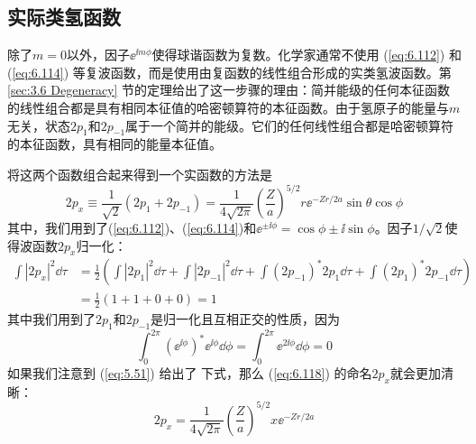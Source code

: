 \subsection*{实际类氢函数}

    除了$m=0$以外，因子$\ee ^{\ii m\phi}$使得球谐函数为复数。化学家通常不使用 (\ref{eq:6.112}) 和 (\ref{eq:6.114}) 等复波函数，而是使用由复函数的线性组合形成的实类氢波函数。第 \ref{sec:3.6 Degeneracy} 节的定理给出了这一步骤的理由：简并能级的任何本征函数的线性组合都是具有相同本征值的哈密顿算符的本征函数。由于氢原子的能量与$m$无关，状态$2p_1$和$2p_{-1}$属于一个简并的能级。它们的任何线性组合都是哈密顿算符的本征函数，具有相同的能量本征值。

    将这两个函数组合起来得到一个实函数的方法是
    \begin{equation}
        2p_x \equiv \frac{1}{\sqrt{2}}\left(2p_1 + 2p_{-1}\right) = \frac{1}{4\sqrt{2\pi}}\left(\frac{Z}{a}\right)^{5/2}r\ee ^{-Zr/2a}\sin\theta\cos\phi
        \label{eq:6.118}
    \end{equation}
    其中，我们用到了(\ref{eq:6.112})、(\ref{eq:6.114})和$\ee ^{\pm \ii \phi} = \cos\phi \pm \ii \sin\phi$。因子$1/\sqrt{2}$使得波函数$2p_x$归一化：
    \begin{equation*}
        \begin{aligned}
            \int\left|2p_x\right|^2\dd \tau & = \frac{1}{2}\left(\int\left|2p_1\right|^2\dd \tau + \int\left|2p_{-1}\right|^2\dd \tau + \int\left(2p_{-1}\right)^{\ast}2p_1\dd \tau + \int\left(2p_{1}\right)^{\ast}2p_{-1}\dd \tau\right)\\
            & = \frac{1}{2}\left(1 + 1 + 0 + 0\right) = 1
        \end{aligned}
    \end{equation*}
    其中我们用到了$2p_1$和$2p_{-1}$是归一化且互相正交的性质，因为
    \begin{equation*}
        \int_{0}^{2\pi}\left(\ee ^{\ii \phi}\right)^{\ast}\ee ^{\ii \phi}\dd \phi = \int_{0}^{2\pi}\ee ^{2\ii \phi}\dd \phi = 0
    \end{equation*}
    如果我们注意到 (\ref{eq:5.51}) 给出了 下式，那么 (\ref{eq:6.118}) 的命名$2p_x$就会更加清晰：
    \begin{equation}
        2p_x = \frac{1}{4\sqrt{2\pi}}\left(\frac{Z}{a}\right)^{5/2}x\ee ^{-Zr/2a}
        \label{eq:6.119}
    \end{equation}

